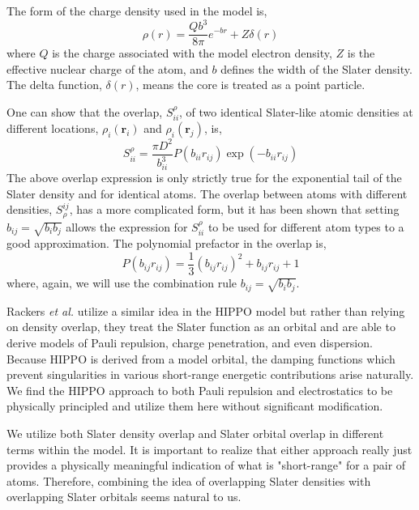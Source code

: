 \documentclass[journal=jacsat,manuscript=article]{achemso}
\begin{document}
The form of the charge density used in the model is,
\begin{equation}
  \rho(r)=\frac{Qb^3}{8\pi}e^{-br}+Z\delta(r)
  \label{eq:slater}
\end{equation}
\noindent
where $Q$ is the charge associated with the model electron density,
$Z$ is the effective nuclear charge of the atom, and $b$ defines the width
of the Slater density. The delta function, $\delta(r)$, means the core is
treated as a point particle.

One can show that the overlap, $S_{ii}^\rho$, of two identical Slater-like atomic densities
at different locations, $\rho_i(\bm{r}_i)$ and $\rho_i(\bm{r}_j)$, is,
\begin{equation}
  S_{ii}^\rho=\frac{\pi D^2}{b_{ii}^3}P(b_{ii}r_{ij})\exp(-b_{ii}r_{ij})
\end{equation}
The above overlap expression is only strictly true for the exponential tail
of the Slater density and for identical atoms. The overlap between atoms
with different densities, $S^{ij}_\rho$, has a more complicated form, but
it has been shown that setting $b_{ij}=\sqrt{b_ib_j}$ allows the expression
for $S_{ii}^\rho$ to be used for different atom types to a good
approximation\cite{van2016beyond}. The polynomial prefactor in the overlap is,
\begin{equation}
  P(b_{ij}r_{ij})=\frac13(b_{ij}r_{ij})^2 + b_{ij}r_{ij}+1
\end{equation}
where, again, we will use the combination rule $b_{ij}=\sqrt{b_ib_j}$.

Rackers \textit{et al.} utilize a similar idea in the HIPPO model\cite{rackers2021polarizable}
but rather than relying on density overlap, they treat the Slater function as an
orbital and are able to derive models of Pauli repulsion, charge penetration, and
even dispersion. Because HIPPO is derived from a model orbital, the damping functions
which prevent singularities in various short-range energetic contributions arise naturally.
We find the HIPPO approach to both Pauli repulsion and electrostatics to be physically principled
and utilize them here without significant modification.

We utilize both Slater density overlap and Slater orbital overlap in different terms within
the model. It is important to realize that either approach really just provides a
physically meaningful indication of what is "short-range" for a pair of atoms. Therefore,
combining the idea of overlapping Slater densities with overlapping Slater orbitals seems
natural to us.
\end{document}
